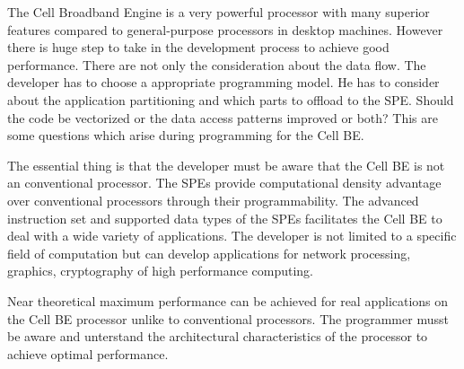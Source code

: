 \documentclass[DIV10, abstracton, openright, footsepline, headsepline, twoside, 9pt,
bigheadings]{scrreprt}
\begin{document}
The Cell Broadband Engine is a very powerful processor with many superior features
compared to general-purpose processors in desktop machines. However there is huge
step to take in the development process to achieve good performance. There are not
only the consideration about the data flow. The developer has to choose a appropriate
programming model. He has to consider about the application partitioning and
which parts to offload to the SPE. Should the code be vectorized or the data access
patterns improved or both? This are some questions which arise during programming for
the Cell BE.

The essential thing is that the developer must be aware that the Cell BE is not
an conventional processor. The SPEs provide computational density advantage over
conventional processors through their programmability. The advanced instruction
set and supported data types of the SPEs facilitates the Cell BE to deal with a
wide variety of applications. The developer is not limited to a specific field
of computation but can develop applications for network processing, graphics,
cryptography of high performance computing.

Near theoretical maximum performance can be achieved for real applications on
the Cell BE processor unlike to conventional processors. The programmer musst be
aware and unterstand the architectural characteristics of the processor to achieve
optimal performance.



 \printnomenclature
\end{document}
